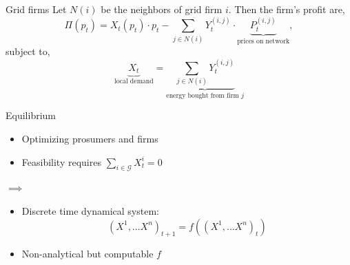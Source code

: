 \documentclass[xcolor={svgnames}]{beamer}
\begin{document}
\begin{frame}{Grid firms}
    Let $N(i)$ be the neighbors of grid firm $i$. Then the firm's profit are,
    \begin{equation}
        \Pi(p_t) = X_{t}(p_t) \cdot p_t - \sum_{j \in N(i)} Y^{(i, j)}_{t} \cdot \underbrace{P^{(i, j)}_t}_{\text{prices on network}},
    \end{equation}
    subject to,
    \begin{equation}
        \underbrace{X_t}_{\text{local demand}} =  \underbrace{\sum_{j \in N(i)} Y^{(i, j)}_{t}}_{\text{energy bought from firm $j$}}
    \end{equation}
\end{frame}

\begin{frame}{Equilibrium}
    \begin{minipage}{.35\linewidth}
        \begin{itemize}
            \item Optimizing prosumers and firms
            \item Feasibility requires $\sum_{i \in \mathcal{G}} X^i_t = 0$
        \end{itemize}
    \end{minipage}
    $\implies$
    \begin{minipage}{.55\linewidth}
        \begin{itemize}
            \item Discrete time dynamical system: \begin{equation*}(X^1, \ldots X^n)_{t+1} = f((X^1, \ldots X^n)_t)\end{equation*}
            \item Non-analytical but computable $f$
        \end{itemize}
    \end{minipage}
    \vfill
    \centering

\end{frame}
\end{document}
